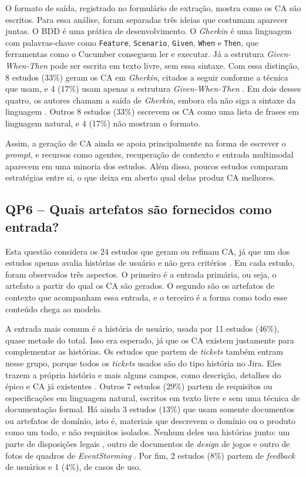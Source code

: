 O formato de saída, registrado no formulário de extração, mostra como os CA são escritos. Para essa análise, foram separadas três ideias que costumam aparecer juntas. O BDD é uma prática de desenvolvimento. O \textit{Gherkin} é uma linguagem com palavras-chave como \texttt{Feature}, \texttt{Scenario}, \texttt{Given}, \texttt{When} e \texttt{Then}, que ferramentas como o Cucumber conseguem ler e executar. Já a estrutura \textit{Given-When-Then} pode ser escrita em texto livre, sem essa sintaxe. Com essa distinção, 8 estudos (33\%) geram os CA em \textit{Gherkin}, citados a seguir conforme a técnica que usam, e 4 (17\%) usam apenas a estrutura \textit{Given-When-Then} \cite{baker2026,wang2025,avasiloaie2025,khelifa2026}. Em dois desses quatro, os autores chamam a saída de \textit{Gherkin}, embora ela não siga a sintaxe da linguagem \cite{wang2025,avasiloaie2025}. Outros 8 estudos (33\%) escrevem os CA como uma lista de frases em linguagem natural, e 4 (17\%) não mostram o formato.

Assim, a geração de CA ainda se apoia principalmente na forma de escrever o \textit{prompt}, e recursos como agentes, recuperação de contexto e entrada multimodal aparecem em uma minoria dos estudos. Além disso, poucos estudos comparam estratégias entre si, o que deixa em aberto qual delas produz CA melhores.

\subsection{QP6 -- Quais artefatos são fornecidos como entrada?}
\label{sec:qp6}

Esta questão considera os 24 estudos que geram ou refinam CA, já que um dos estudos apenas avalia histórias de usuário e não gera critérios \cite{ma2026}. Em cada estudo, foram observados três aspectos. O primeiro é a entrada primária, ou seja, o artefato a partir do qual os CA são gerados. O segundo são os artefatos de contexto que acompanham essa entrada, e o terceiro é a forma como todo esse conteúdo chega ao modelo.

A entrada mais comum é a história de usuário, usada por 11 estudos (46\%), quase metade do total. Isso era esperado, já que os CA existem justamente para complementar as histórias. Os estudos que partem de \textit{tickets} também entram nesse grupo, porque todos os \textit{tickets} usados são do tipo história no Jira. Eles trazem a própria história e mais alguns campos, como descrição, detalhes do épico e CA já existentes \cite{baker2026,huang2026}. Outros 7 estudos (29\%) partem de requisitos ou especificações em linguagem natural, escritos em texto livre e sem uma técnica de documentação formal. Há ainda 3 estudos (13\%) que usam somente documentos ou artefatos de domínio, isto é, materiais que descrevem o domínio ou o produto como um todo, e não requisitos isolados. Nenhum deles usa histórias junto: um parte de disposições legais \cite{hassani2026}, outro de documentos de \textit{design} de jogos \cite{khelifa2026} e outro de fotos de quadros de \textit{EventStorming} \cite{jurgelaitis2026}. Por fim, 2 estudos (8\%) partem de \textit{feedback} de usuários e 1 (4\%), de casos de uso.

